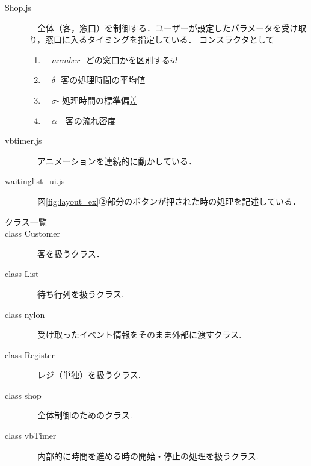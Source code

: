 \documentclass[12pt,a4j]{ltjsarticle}
\begin{document}
\begin{description}
  \item[Shop.js]　全体（客，窓口）を制御する．ユーザーが設定したパラメータを受け取り，窓口に入るタイミングを指定している．
  コンスラクタとして
  \begin{enumerate}[label=(\alph*)]
	\item　$number$- どの窓口かを区別する$id$
	\item　$\delta$- 客の処理時間の平均値
	\item　$\sigma$- 処理時間の標準偏差
	\item　$\alpha$ - 客の流れ密度
\end{enumerate}
\vspace{10mm}

  \item[vbtimer.js]　アニメーションを連続的に動かしている．
  \vspace{10mm}
  
  \item[waitinglist\_ui.js]　図\ref{fig:layout_ex}②部分のボタンが押された時の処理を記述している．
\end{description}

\clearpage

\begin{description}
\item[クラス一覧]
\item[class Customer]　客を扱うクラス．
\item[class List]　待ち行列を扱うクラス.
\item[class nylon]　受け取ったイベント情報をそのまま外部に渡すクラス.
\item[class Register]　レジ（単独）を扱うクラス.
\item[class shop]　全体制御のためのクラス.
\item[class vbTimer]　内部的に時間を進める時の開始・停止の処理を扱うクラス.
\end{description}
\clearpage
\end{document}

